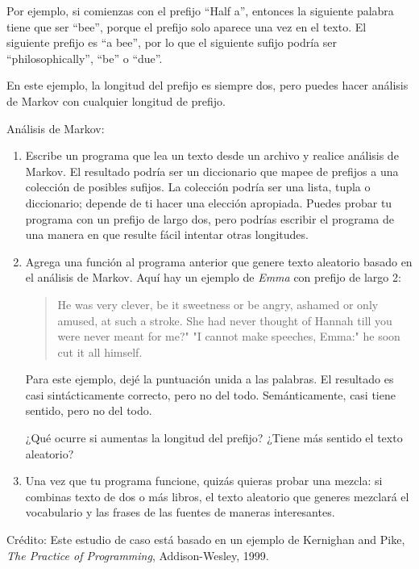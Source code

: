 \documentclass[10pt]{book}
\begin{document}
Por ejemplo, si comienzas con el prefijo ``Half a'', entonces la
siguiente palabra tiene que ser ``bee'', porque el prefijo solo aparece
una vez en el texto.  El siguiente prefijo es ``a bee'', por lo que el
siguiente sufijo podría ser ``philosophically'', ``be'' o ``due''.

En este ejemplo, la longitud del prefijo es siempre dos, pero
puedes hacer análisis de Markov con cualquier longitud de prefijo.

\begin{exercise}

Análisis de Markov:

\begin{enumerate}

\item Escribe un programa que lea un texto desde un archivo y realice análisis
de Markov.  El resultado podría ser un diccionario que mapee de
prefijos a una colección de posibles sufijos.  La colección
podría ser una lista, tupla o diccionario; depende de ti hacer
una elección apropiada.  Puedes probar tu programa con un prefijo
de largo dos, pero podrías escribir el programa de una manera en que resulte
fácil intentar otras longitudes.

\item Agrega una función al programa anterior que genere texto aleatorio
basado en el análisis de Markov.  Aquí hay un ejemplo de {\em Emma}
con prefijo de largo 2:

\begin{quote}
He was very clever, be it sweetness or be angry, ashamed or only
amused, at such a stroke. She had never thought of Hannah till you
were never meant for me?" "I cannot make speeches, Emma:" he soon cut
it all himself.
\end{quote}

Para este ejemplo, dejé la puntuación unida a las palabras.
El resultado es casi sintácticamente correcto, pero no del todo.
Semánticamente, casi tiene sentido, pero no del todo.

¿Qué ocurre si aumentas la longitud del prefijo?  ¿Tiene más sentido
el texto aleatorio?

\item Una vez que tu programa funcione, quizás quieras probar una mezcla:
si combinas texto de dos o más libros, el texto aleatorio
que generes mezclará el vocabulario y las frases de
las fuentes de maneras interesantes.

\end{enumerate}

Crédito: Este estudio de caso está basado en un ejemplo de Kernighan and
Pike, {\em The Practice of Programming}, Addison-Wesley, 1999.

\end{exercise}
\end{document}
